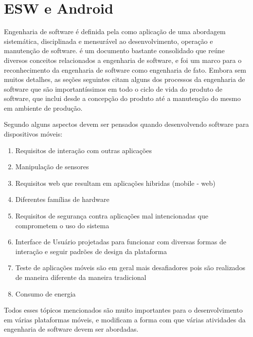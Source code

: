 \chapter{ESW e Android}
\label{cap:eswandroid}

Engenharia de software é definida pela  como aplicação de uma abordagem sistemática, disciplinada e mensurável ao desenvolvimento, operação e manutenção de software.  é um documento bastante consolidado que reúne diversos conceitos relacionados a engenharia de software, e foi um marco para o reconhecimento da engenharia de software como engenharia de fato. Embora sem muitos detalhes, as seções seguintes citam alguns dos processos da engenharia de software que são importantíssimos em todo o ciclo de vida do produto de software, que inclui desde a concepção do produto até a manutenção do mesmo em ambiente de produção.

Segundo  alguns aspectos devem ser pensados quando desenvolvendo software para dispositivos móveis:

\begin{enumerate}
\item Requisitos de interação com outras aplicações
\item Manipulação de sensores
\item Requisitos web que resultam em aplicações hibridas (mobile - web)
\item Diferentes famílias de hardware
\item Requisitos de segurança contra aplicações mal intencionadas que comprometem o uso do sistema
\item Interface de Usuário projetadas para funcionar com diversas formas de interação e seguir padrões de design da plataforma
\item Teste de aplicações móveis são em geral mais desafiadores pois são realizados de maneira diferente da maneira tradicional
\item Consumo de energia
\end{enumerate}

Todos esses tópicos mencionados são muito importantes para o desenvolvimento em várias plataformas móveis, e modificam a forma com que várias atividades da engenharia de software devem ser abordadas.

